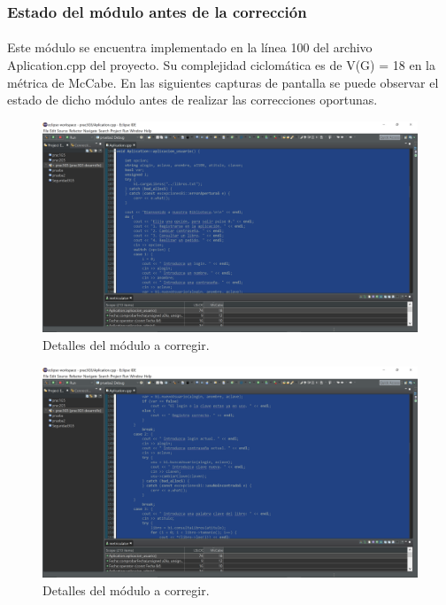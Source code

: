 	\subsubsection{Estado del módulo antes de la corrección}
	
		\paragraph{}Este módulo se encuentra implementado en la línea 100 del archivo Aplication.cpp del proyecto. Su complejidad ciclomática es de V(G) = 18 en la métrica de McCabe. En las siguientes capturas de pantalla se puede observar el estado de dicho módulo antes de realizar las correcciones oportunas.
		
		\begin{figure}[H]
			\centering
			\includegraphics[scale=0.1]{img/estebanFinal1.png}
			\caption{Detalles del módulo a corregir.}
			\label{estebanFinal1}
		\end{figure}
	
		\begin{figure}[H]
			\centering
			\includegraphics[scale=0.1]{img/estebanFinal2.png}
			\caption{Detalles del módulo a corregir.}
			\label{estebanFinal2}
		\end{figure}
	
